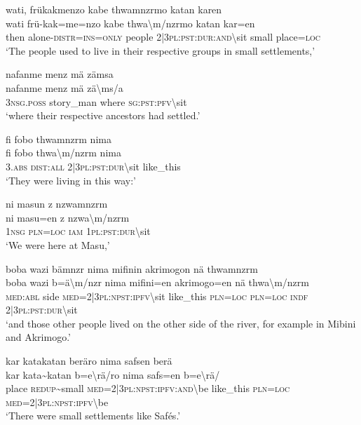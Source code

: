 \ea\label{ex:2:a1701}
wati, frükakmenzo kabe thwamnzrmo katan karen\\
\gll wati	frü-kak=me=nzo	kabe	thwa{\textbackslash}m/nzrmo	katan	kar=en\\
     then	alone-\textsc{distr}=\textsc{ins}=\textsc{only}	people	2|3\textsc{pl}:\textsc{pst}:\textsc{dur}:\textsc{and}{\textbackslash}sit	small	place=\textsc{loc}\\
\glt `The people used to live in their respective groups in small settlements,'
\z

\ea\label{ex:2:a1703}
nafanme menz mä zämsa\\
\gll nafanme	menz	mä	zä{\textbackslash}ms/a\\
     3\textsc{nsg}.\textsc{poss}	story\_man	where	\textsc{sg}:\textsc{pst}:\textsc{pfv}{\textbackslash}sit\\
\glt `where their respective ancestors had settled.'
\z

\ea\label{ex:2:a1704}
fi fobo thwamnzrm nima\\
\gll fi	fobo	thwa{\textbackslash}m/nzrm	nima\\
     3.\textsc{abs}	\textsc{dist}:\textsc{all}	2|3\textsc{pl}:\textsc{pst}:\textsc{dur}{\textbackslash}sit	like\_this\\
\glt `They were living in this way:'
\z

\ea\label{ex:2:a1705}
ni masun z nzwamnzrm\\
\gll ni	masu=en	z	nzwa{\textbackslash}m/nzrm\\
     1\textsc{nsg}	\textsc{pln}=\textsc{loc}	\textsc{iam}	1\textsc{pl}:\textsc{pst}:\textsc{dur}{\textbackslash}sit\\
\glt `We were here at Masu,'
\z

\ea\label{ex:2:a1706}
boba wazi bämnzr nima mifinin akrimogon nä thwamnzrm\\
\gll boba	wazi	b=ä{\textbackslash}m/nzr	nima	mifini=en	akrimogo=en	nä	thwa{\textbackslash}m/nzrm\\
     \textsc{med}:\textsc{abl}	side	\textsc{med}=2|3\textsc{pl}:\textsc{npst}:\textsc{ipfv}{\textbackslash}sit	like\_this	\textsc{pln}=\textsc{loc}	\textsc{pln}=\textsc{loc}	\textsc{indf}	2|3\textsc{pl}:\textsc{pst}:\textsc{dur}{\textbackslash}sit\\
\glt `and those other people lived on the other side of the river, for example in Mibini and Akrimogo.'
\z

\ea\label{ex:2:a1707}
kar katakatan beräro nima safsen berä\\
\gll kar	kata{\textasciitilde}katan	b=e{\textbackslash}rä/ro	nima	safs=en	b=e{\textbackslash}rä/\\
     place	\textsc{redup}{\textasciitilde}small	\textsc{med}=2|3\textsc{pl}:\textsc{npst}:\textsc{ipfv}:\textsc{and}{\textbackslash}be	like\_this	\textsc{pln}=\textsc{loc}	\textsc{med}=2|3\textsc{pl}:\textsc{npst}:\textsc{ipfv}{\textbackslash}be\\
\glt `There were small settlements like Safés.'
\z

